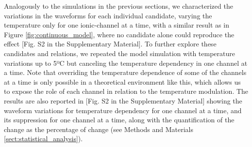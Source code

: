 Analogously to the simulations in the previous sections, we characterized the variations in the waveforms for each individual candidate, varying the temperature only for one ionic-channel at a time, with a similar result as in Figure \ref{fig:continuous_model}, where no candidate alone could reproduce the effect [Fig. S2 in the Supplementary Material]. To further explore these candidates and relations, we repeated the model simulation with temperature variations up to 5ºC but canceling the temperature dependency in one channel at a time. Note that overriding the temperature dependence of some of the channels at a time is only possible in a theoretical environment like this, which allows us to expose the role of each channel in relation to the temperature modulation. The results are also reported in [Fig. S2 in the Supplementary Material] showing the waveform variations for temperature dependency for one channel at a time, and its suppression for one channel at a time, along with the quantification of the change as the percentage of change (see Methods and Materials \ref{sect:statistical_analysis}). 

